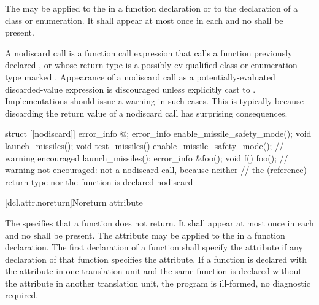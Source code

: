 \pnum
The  
may be applied to the 
in a function declaration or to the declaration of a class or enumeration.
It shall appear at most once in each  and
no  shall be present.

\pnum
\begin{note}
A nodiscard call is a function call expression that
calls a function previously declared , or
whose return type is a possibly cv-qualified class or enumeration type
marked . Appearance of a nodiscard call as
a potentially-evaluated discarded-value expression
is discouraged unless explicitly cast to .
Implementations should issue a warning in such cases.
This is typically because discarding the return value
of a nodiscard call has surprising consequences.
\end{note}

\pnum
\begin{example}
\begin{codeblock}
struct [[nodiscard]] error_info { @\commentellip@ };
error_info enable_missile_safety_mode();
void launch_missiles();
void test_missiles() {
  enable_missile_safety_mode(); // warning encouraged
  launch_missiles();
}
error_info &foo();
void f() { foo(); }             // warning not encouraged: not a nodiscard call, because neither
                                // the (reference) return type nor the function is declared nodiscard
\end{codeblock}
\end{example}

[dcl.attr.noreturn]{Noreturn attribute}%

\pnum
The   specifies that a function does not return. It
shall appear at most once in each  and no
 shall be present. The attribute may be applied to the
 in a function declaration. The first declaration of a function shall
specify the  attribute if any declaration of that function specifies the
 attribute. If a function is declared with the  attribute in one
translation unit and the same function is declared without the  attribute in another
translation unit, the program is ill-formed, no diagnostic required.

